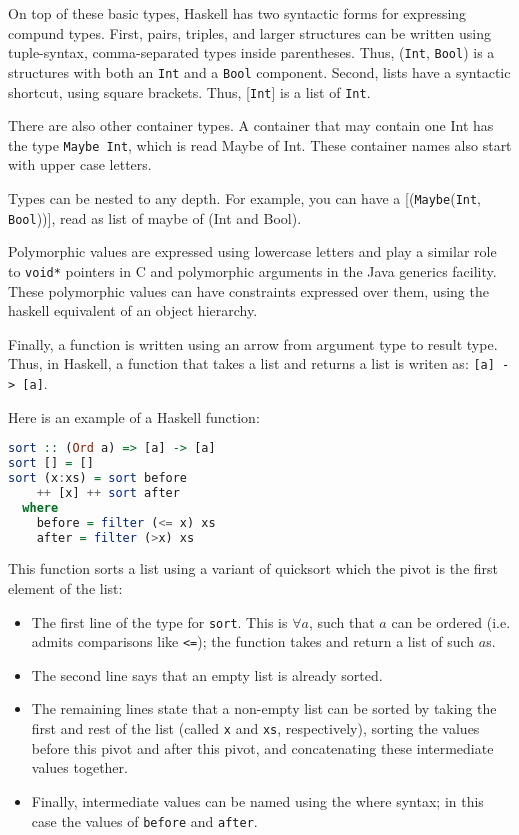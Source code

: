 On top of these basic types, Haskell has two syntactic forms for expressing
compund types. First, pairs, triples, and larger structures can be written
using tuple-syntax, comma-separated types inside parentheses. Thus,
(\texttt{Int}, \texttt{Bool}) is a structures with both an \texttt{Int} and a
\texttt{Bool} component. Second, lists have a syntactic shortcut, using square
brackets. Thus, [\texttt{Int}] is a list of \texttt{Int}.

There are also other container types. A container that may contain one Int has
the type \texttt{Maybe Int}, which is read Maybe of Int. These container names
also start with upper case letters.

Types can be nested to any depth. For example, you can have a
[(\texttt{Maybe}(\texttt{Int}, \texttt{Bool}))], read as list of maybe of (Int
and Bool).

Polymorphic values are expressed using lowercase letters and play a similar
role to \texttt{void*} pointers in C and polymorphic arguments in the Java
generics facility. These polymorphic values can have constraints expressed over
them, using the haskell equivalent of an object hierarchy.

Finally, a function is written using an arrow from argument type to result
type. Thus, in Haskell, a function that takes a list and returns a list is
writen as: \texttt{[a] -> [a]}.

Here is an example of a Haskell function:

\begin{lstlisting}[language=Haskell]
sort :: (Ord a) => [a] -> [a]
sort [] = []
sort (x:xs) = sort before
    ++ [x] ++ sort after
  where 
    before = filter (<= x) xs
    after = filter (>x) xs
\end{lstlisting}

This function sorts a list using a variant of quicksort which the pivot is the first element of the list:
\begin{itemize} 
\item The first line of the type for \texttt{sort}. This is $\forall a$, such
that $a$ can be ordered (i.e. admits comparisons like \texttt{<=}); the
function takes and return a list of such $a$s.  
\item The second line says that an empty list is already sorted.  
\item The remaining lines state that a non-empty list can be sorted by taking
the first and rest of the list (called \texttt{x} and \texttt{xs},
respectively), sorting the values before this pivot and after this pivot, and
concatenating these intermediate values together.  
\item Finally, intermediate values can be named using the where syntax; in this
case the values of \texttt{before} and \texttt{after}.
\end{itemize}

